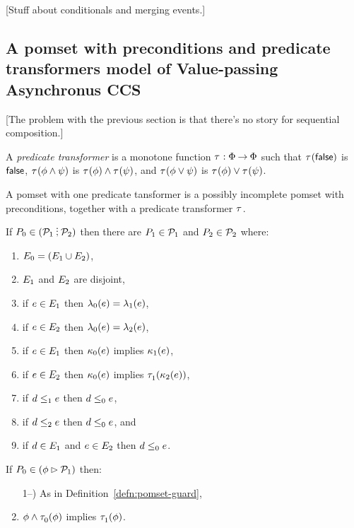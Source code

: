 [Stuff about conditionals and merging events.]

\subsection{A pomset with preconditions and predicate transformers model of Value-passing Asynchronus CCS}

[The problem with the previous section is that there's no story for sequential composition.]

\begin{definition}
  A \emph{predicate transformer} is a monotone function
  $\tau^{}:\Phi\mathbin\rightarrow\Phi$ such that
  $\tau^{}(\mathsf{false})$ is $\mathsf{false}$,
  $\tau^{}(\phi\land\psi)$ is $\tau^{}(\phi)\land\tau^{}(\psi)$, and
  $\tau^{}(\phi\lor\psi)$ is $\tau^{}(\phi)\lor\tau^{}(\psi)$.
\end{definition}

\begin{definition}
  A pomset with one predicate tansformer is a possibly incomplete
  pomset with preconditions, together with a predicate transformer $\tau^{}$.
\end{definition}

\begin{definition}
  If $\aPS_0 \in (\aPSS_1\sSEMI\aPSS_2)$ then
  there are $P_1\in\mathcal{P}_1$ and $P_2\in\mathcal{P}_2$ where:
  \begin{enumerate}
  \item $E_0 = (E_1\cup E_2)$,
  \item $E_1$ and  $E_2$ are disjoint,
  \item if $e\in E_1$ then $\lambda_0(e) = \lambda_1(e)$, 
  \item if $e\in E_2$ then $\lambda_0(e) = \lambda_2(e)$,
  \item if $e\in E_1$ then $\kappa_0(e)$ implies $\kappa_1(e)$, 
  \item if $e\in E_2$ then $\kappa_0(e)$ implies $\tau^{}_1(\kappa_2(e))$,
  \item if $d\le_1e$ then $d\le_0e$,
  \item if $d\le_2e$ then $d\le_0e$, and
  \item if $d\in E_1$ and $e\in E_2$ then $d\le_0e$.
  \end{enumerate}
\end{definition}

\begin{definition}
  If $P_0 \in (\phi\mathbin\rhd\mathcal{P}_1)$ then:
  \begin{enumerate}
    \setcounter{enumi}{\value{pomsetGuardCount}}
  \item[1--\thepomsetGuardCount)] As in Definition~\ref{defn:pomset-guard},
  \item $\phi\land\tau^{}_0(\phi)$ implies $\tau^{}_1(\phi)$.
  \end{enumerate}
\end{definition}


